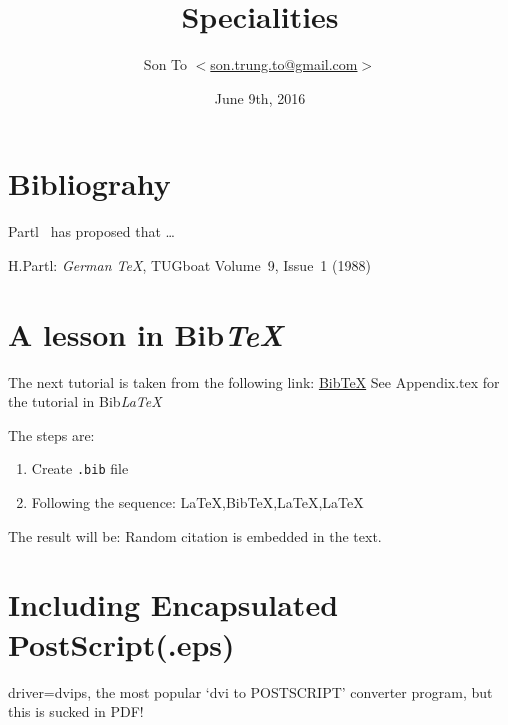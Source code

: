 \documentclass[a4paper,11pt]{article}
\author{Son To $<$\href{mailto:son.trung.to@gmail.com}%
{son.trung.to@gmail.com}$>$}
\date{June 9th, 2016}
\title{Specialities}
\begin{document}
  \maketitle
  \tableofcontents
  \thispagestyle{empty}
  \clearpage{}
  \section{Bibliograhy}
Partl~\cite{pa} has
proposed that \ldots
  \begin{thebibliography}{99}
    H.Partl:
    \emph{German \TeX},
    TUGboat Volume~9, Issue~1 (1988)
  \end{thebibliography}

\section{A lesson in Bib\emph{TeX}}
The next tutorial is taken from the
following link:
\bigbreak
\href{https://www.latex-tutorial.com/tutorials/beginners/latex-bibtex/}%
{BibTeX}
\flushleft
See Appendix.tex for the tutorial in Bib\emph{LaTeX}

The steps are:
\flushleft
\begin{enumerate}
  \item Create \verb+.bib+ file
  \item Following the sequence: La\TeX,Bib\TeX,La\TeX,La\TeX
\end{enumerate}
The result will be:
Random citation \cite{DUMMY:1} is embedded in the text.
\newpage



\section{Including Encapsulated PostScript(.eps)}
driver=dvips, the most popular `dvi to POSTSCRIPT'
converter program, but this is sucked in PDF!
\end{document}
